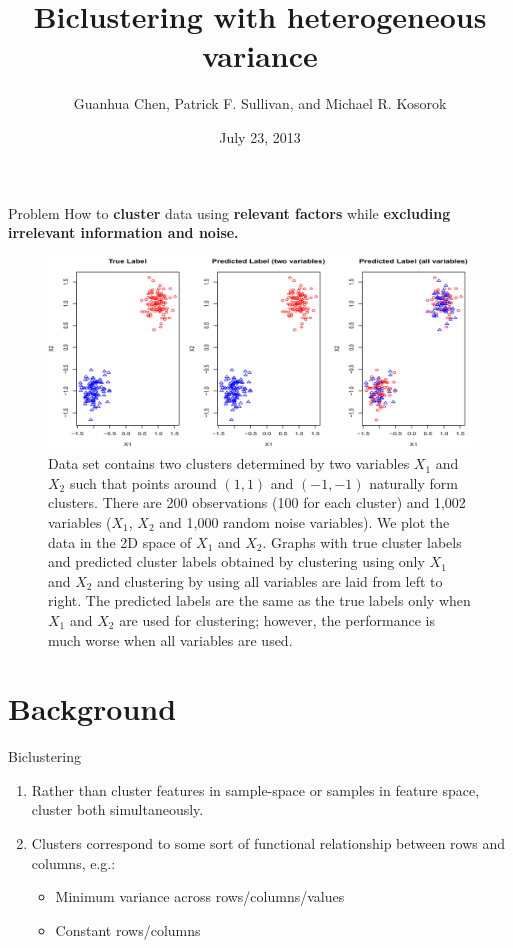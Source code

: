 \documentclass{beamer}
\title{Biclustering with heterogeneous variance}
\author{Guanhua Chen, Patrick F. Sullivan, and Michael R. Kosorok}
\date{July 23, 2013}
\begin{document}
\begin{frame}
\titlepage%
\end{frame}

\begin{frame}{Problem}
  How to \textbf{cluster} data using \textbf{relevant factors} while
  \textbf{excluding irrelevant information and noise.}
  \begin{figure}
    \includegraphics[width=\linewidth]{figures/fig1v2.png}
    \caption{Data set contains two clusters determined by two variables $X_1$
      and $X_2$ such that points around $(1,1)$ and $(-1,-1)$ naturally form
      clusters. There are 200 observations (100 for each cluster) and 1,002
      variables ($X_1$, $X_2$ and 1,000 random noise variables). We plot the
      data in the 2D space of $X_1$ and $X_2$. Graphs with true cluster labels
      and predicted cluster labels obtained by clustering using only $X_1$ and
      $X_2$ and clustering by using all variables are laid from left to right.
      The predicted labels are the same as the true labels only when $X_1$ and
      $X_2$ are used for clustering; however, the performance is much worse
      when all variables are used.}
  \end{figure}
\end{frame}

\section{Background}

\begin{frame}{Biclustering}
  \begin{enumerate}
    \item Rather than cluster features in sample-space or samples in feature
      space, cluster both simultaneously.
    \item Clusters correspond to some sort of functional relationship between
      rows and columns, e.g.:
      \begin{itemize}
        \item Minimum variance across rows/columns/values
        \item Constant rows/columns
      \end{itemize}
  \end{enumerate}
\end{frame}
\end{document}
